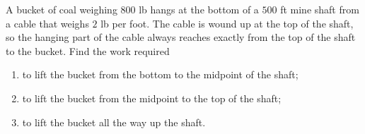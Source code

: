 A bucket of coal weighing $800$ lb hangs at the bottom of a $500$ ft mine shaft from a cable that weighs $2$ lb per foot. The cable is wound up at the top of the shaft, so the hanging part of the cable always reaches exactly from the top of the shaft to the bucket. Find the work required
\begin{enumerate}
\item[(a)] to lift the bucket from the bottom to the midpoint of the shaft;
\item[(b)] to lift the bucket from the midpoint to the top of the shaft;
\item[(c)] to lift the bucket all the way up the shaft.
\end{enumerate}
